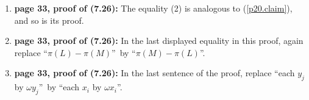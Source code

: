 \documentclass[numbers=enddot,12pt,final,onecolumn,notitlepage]{scrartcl}%
\theoremstyle{definition}
\let\prodnonlimits\prod
\renewcommand{\prod}{\prodnonlimits\limits}
\begin{document}
\begin{enumerate}
Now, our claim that $x^{q-1}=-\pi\left(  K\right)  $ for
$K=\operatorname*{span}\left\{  x\right\}  $ is easy to see: Indeed,
$K=\operatorname*{span}\left\{  x\right\}  =\left\{  \alpha x\ \mid\ \alpha\in
F\right\}  $, so that%
\begin{align*}
\pi\left(  K\right)   &  =\left(  \text{product of the nonzero elements of
}K\right) \\
&  =\prod_{\alpha\in F\setminus\left\{  0\right\}  }\left(  \alpha x\right)
=\underbrace{\left(  \prod_{\alpha\in F\setminus\left\{  0\right\}  }%
\alpha\right)  }_{\substack{=-1\\\text{(by Lemma \ref{lem.wilson-F})}%
}}\underbrace{x^{\left\vert F\setminus\left\{  0\right\}  \right\vert }%
}_{\substack{=x^{q-1}\\\text{(since }\left\vert F\setminus\left\{  0\right\}
\right\vert =q-1\text{)}}}\\
&  =-x^{q-1},
\end{align*}
and therefore $x^{q-1}=-\pi\left(  K\right)  $, qed.

\item \textbf{page 33, proof of (7.26):} The equality (2) is analogous to
(\ref{p20.claim}), and so is its proof.

\item \textbf{page 33, proof of (7.26):} In the last displayed equality in
this proof, again replace \textquotedblleft$\pi\left(  L\right)  -\pi\left(
M\right)  $\textquotedblright\ by \textquotedblleft$\pi\left(  M\right)
-\pi\left(  L\right)  $\textquotedblright.

\item \textbf{page 33, proof of (7.26):} In the last sentence of the proof,
replace \textquotedblleft each $y_{j}$ by $\omega y_{j}$\textquotedblright\ by
\textquotedblleft each $x_{i}$ by $\omega x_{i}$\textquotedblright.


\end{enumerate}
\end{document}
